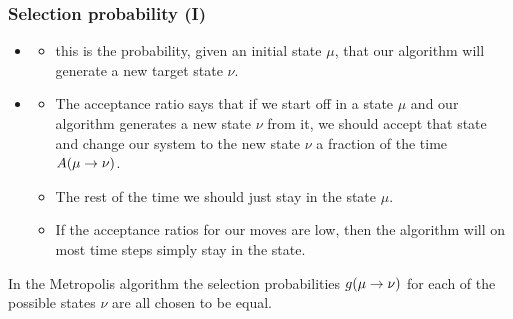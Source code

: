 \documentclass[hyperref={colorlinks=true}]{beamer}
\begin{document}

\begin{frame}%
  \frametitle{Selection probability (I)}
  
  \begin{itemize}
    \item {}
    \begin{itemize}
      \item this is the probability, given an initial state $\mu$, that our algorithm will generate a new target state $\nu$. 
    \end{itemize}
    \item {}
    \begin{itemize}
      \item The acceptance ratio says that if we start off in a state $\mu$ and our algorithm generates a new state $\nu$ from it, we should accept that state and change our system to the new state $\nu$ a fraction of the time $A(\mu \rightarrow \nu)$. 
      \item The rest of the time we should just stay in the state $\mu$.
      \item If the acceptance ratios for our moves are low, then the algorithm will on most time steps simply stay in the state.
    \end{itemize}
  \end{itemize}
  
  In the Metropolis algorithm the selection probabilities $g(\mu \rightarrow \nu)$ for each of the possible states $\nu$ are all chosen to be equal.
  
\end{frame}

\end{document}
